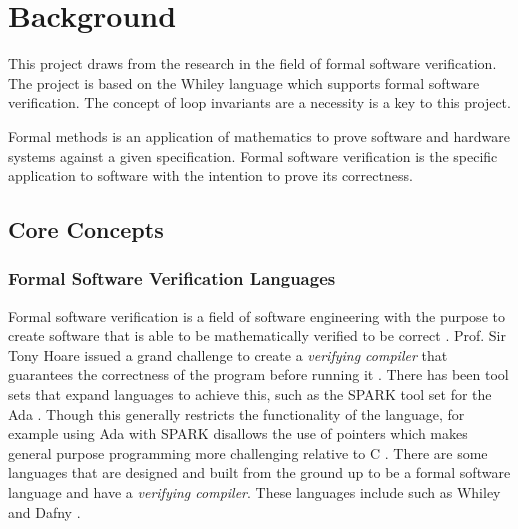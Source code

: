 \chapter{Background}\label{C:background}


This project draws from the research in the field of formal software verification.
The project is based on the Whiley language which supports formal software
verification.
The concept of loop invariants are a necessity is a key to this project.

Formal methods is an application of mathematics to prove software and hardware
systems against a given specification. 
Formal software verification is the specific application to software with
the intention to prove its correctness.


\section{Core Concepts}

\subsection{Formal Software Verification Languages}

Formal software verification is a field of software engineering with the
purpose to create software that is able to be mathematically verified to be
correct \cite{survey-formal-soft}.
Prof. Sir Tony Hoare issued a grand challenge to create a \textit{verifying compiler}
that guarantees the correctness of the program before running it \cite{Hoare-grand}.
There has been tool sets that expand languages to achieve this, such as
the SPARK tool set for the Ada \cite{spark-ada}\cite{spark-high-integ}.
Though this generally restricts the functionality of the language, for example
using Ada with SPARK disallows the use of pointers which makes general purpose
programming more challenging relative to C \cite{spark-ada}.
There are some languages that are designed and built from the ground up to
be a formal software language and have a \textit{verifying compiler}.
These languages include such as Whiley \cite{whiley-origin} and Dafny \cite{dafny-lang}.

